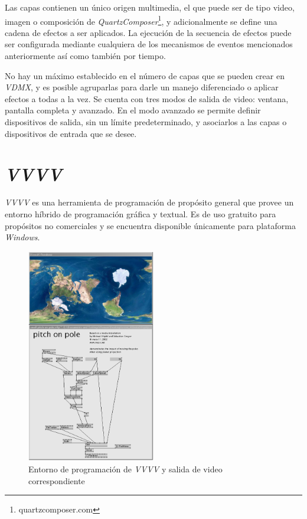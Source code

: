 Las capas contienen un único origen multimedia, el que puede ser de tipo video, imagen o composición de \emph{QuartzComposer}\footnote{quartzcomposer.com}, y adicionalmente se define una cadena de efectos a ser aplicados.
La ejecución de la secuencia de efectos puede ser configurada mediante cualquiera de los mecanismos de eventos mencionados anteriormente así como también por tiempo.

No hay un máximo establecido en el número de capas que se pueden crear en \emph{VDMX}, y es posible agruparlas para darle un manejo diferenciado o aplicar efectos a todas a la vez.
Se cuenta con tres modos de salida de video: ventana, pantalla completa y avanzado. En el modo avanzado se permite definir dispositivos de salida, sin un límite predeterminado, y asociarlos a las capas o dispositivos de entrada que se desee.

\section{\emph{VVVV}}
\emph{VVVV}\cite{VVVV} es una herramienta de programación de propósito general que provee un entorno híbrido de programación gráfica y textual. Es de uso gratuito para propósitos no comerciales y se encuentra disponible únicamente para plataforma \emph{Windows}.

\begin{figure}[H]
  \centering
    \includegraphics[width=0.5\textwidth]{./Apendices/Cap3_aplicaciones/apps-vvvv.png}
  \caption[http://vvvv.org]{Entorno de programación de \emph{VVVV} y salida de video correspondiente}
  \label{fig:Apps-VVVV}
\end{figure}

